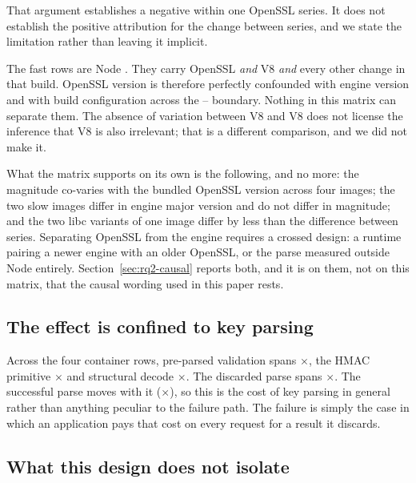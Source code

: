 \documentclass[preprint,12pt,authoryear]{elsarticle}
\begin{document}
That argument establishes a negative within one OpenSSL series. It does not
establish the positive attribution for the change between series, and we state
the limitation rather than leaving it implicit.

The fast rows are Node \NodeTwentySixMuslNodeMajor. They carry OpenSSL
\NodeTwentySixMuslOpensslSeries{} \emph{and} V8 \NodeTwentySixMuslVeight{}
\emph{and} every other change in that build. OpenSSL version is therefore
perfectly confounded with engine version and with build configuration across the
\NodeEighteenOpensslSeries--\NodeTwentySixMuslOpensslSeries{} boundary. Nothing
in this matrix can separate them. The absence of variation between V8
\NodeEighteenVeight{} and V8 \NodeTwentyVeight{} does not license the inference
that V8 \NodeTwentySixMuslVeight{} is also irrelevant; that is a different
comparison, and we did not make it.

What the matrix supports on its own is the following, and no more: the
magnitude co-varies with the bundled OpenSSL version across four images; the two
slow images differ in engine major version and do not differ in magnitude; and
the two libc variants of one image differ by less than the difference between
series. Separating OpenSSL from the engine requires a crossed design: a
runtime pairing a newer engine with an older OpenSSL, or the parse measured
outside Node entirely. Section~\ref{sec:rq2-causal} reports both, and it is on
them, not on this matrix, that the causal wording used in this paper rests.

\subsection{The effect is confined to key parsing}

Across the four container rows, pre-parsed validation spans
\SpanJwtPreparsed$\times$, the HMAC primitive \SpanHmacString$\times$ and
structural decode \SpanDecodeOnly$\times$. The discarded parse spans
\SpanProbeThrows$\times$. The successful parse moves with it
(\SpanProbeSucceeds$\times$), so this is the cost of key parsing in general
rather than anything peculiar to the failure path. The failure is simply the case
in which an application pays that cost on every request for a result it discards.

\subsection{What this design does not isolate}
\end{document}
